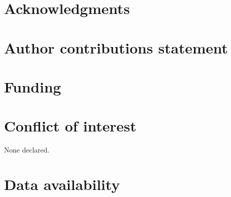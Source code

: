 \section{Acknowledgments}

\section{Author contributions statement}

\section{Funding}

\section{Conflict of interest}
None declared.

\section{Data availability}
